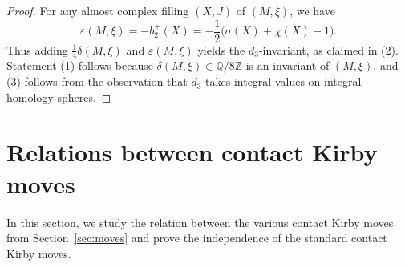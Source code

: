 \documentclass{amsart}
\numberwithin{equation}{section}
\numberwithin{figure}{section}
\theoremstyle{definition}
\theoremstyle{remark}
\newcommand{\Z}{\mathbb{Z}}
\let\olddxi\xi %
\renewcommand{\xi}{\olddxi}
\begin{document}
\begin{proof}
    For any almost complex filling $(X,J)$ of $(M,\xi)$, we have
    \[
    \varepsilon(M,\xi)=-b_2^+(X)=-\frac{1}{2}\big(\sigma(X)+\chi(X)-1\big).
    \]
    Thus adding $\frac{1}{4}\delta(M,\xi)$ and $\varepsilon(M,\xi)$ yields the $d_3$-invariant, as claimed in (2). Statement (1) follows because $\delta(M,\xi)\in\mathbb Q/8\Z$ is an invariant of $(M,\xi)$, and (3) follows from the observation that $d_3$ takes integral values on integral homology spheres.
\end{proof}


\section{Relations between contact Kirby moves}\label{sec:proof_rel_kirbymoves}

In this section, we study the relation between the various contact Kirby moves from Section~\ref{sec:moves} and prove the independence of the standard contact Kirby moves.
\end{document}
